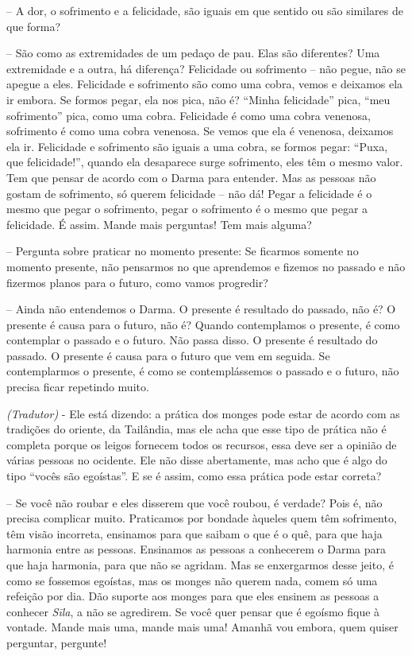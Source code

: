 -- A dor, o sofrimento e a felicidade, são iguais em que sentido ou
são similares de que forma?

-- São como as extremidades de um pedaço de pau. Elas são
diferentes? Uma extremidade e a outra, há diferença? Felicidade ou
sofrimento – não pegue, não se apegue a eles. Felicidade e sofrimento
são como uma cobra, vemos e deixamos ela ir embora. Se formos pegar,
ela nos pica, não é? “Minha felicidade” pica, “meu sofrimento” pica,
como uma cobra. Felicidade é como uma cobra venenosa, sofrimento é como
uma cobra venenosa. Se vemos que ela é venenosa, deixamos ela ir.
Felicidade e sofrimento são iguais a uma cobra, se formos pegar: “Puxa,
que felicidade!”, quando ela desaparece surge sofrimento, eles têm o
mesmo valor. Tem que pensar de acordo com o Darma para entender. Mas as
pessoas não gostam de sofrimento, só querem felicidade – não dá! Pegar
a felicidade é o mesmo que pegar o sofrimento, pegar o sofrimento é o
mesmo que pegar a felicidade. É assim. Mande mais perguntas! Tem mais
alguma?

-- Pergunta sobre praticar no momento presente: Se ficarmos somente
no momento presente, não pensarmos no que aprendemos e fizemos no
passado e não fizermos planos para o futuro, como vamos progredir?

-- Ainda não entendemos o Darma. O presente é resultado do passado,
não é? O presente é causa para o futuro, não é? Quando contemplamos o
presente, é como contemplar o passado e o futuro. Não passa disso. O
presente é resultado do passado. O presente é causa para o futuro que
vem em seguida. Se contemplarmos o presente, é como se contemplássemos
o passado e o futuro, não precisa ficar repetindo muito.

\textit{(Tradutor)} - Ele está dizendo: a prática dos monges pode
estar de acordo com as tradições do oriente, da Tailândia, mas ele acha
que esse tipo de prática não é completa porque os leigos fornecem todos
os recursos, essa deve ser a opinião de várias pessoas no ocidente. Ele
não disse abertamente, mas acho que é algo do tipo “vocês são
egoístas”. E se é assim, como essa prática pode estar correta?

-- Se você não roubar e eles disserem que você roubou, é verdade?
Pois é, não precisa complicar muito. Praticamos por bondade àqueles
quem têm sofrimento, têm visão incorreta, ensinamos para que saibam o
que é o quê, para que haja harmonia entre as pessoas. Ensinamos as
pessoas a conhecerem o Darma para que haja harmonia, para que não se
agridam. Mas se enxergarmos desse jeito, é como se fossemos egoístas,
mas os monges não querem nada, comem só uma refeição por dia. Dão
suporte aos monges para que eles ensinem as pessoas a conhecer
\textit{Sīla}, a não se agredirem. Se você quer pensar que é egoísmo
fique à vontade. Mande mais uma, mande mais uma! Amanhã vou embora,
quem quiser perguntar, pergunte!

